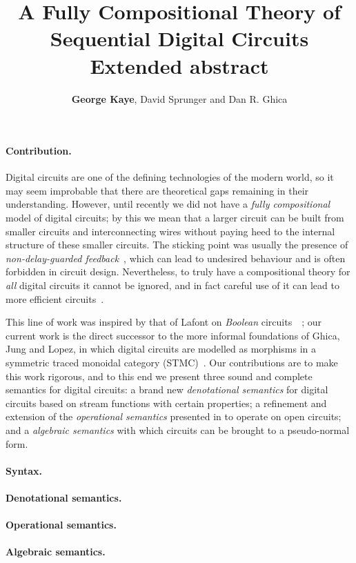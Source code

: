 \documentclass[10pt]{article}
\title{
    \vspace{-3em}
    A Fully Compositional Theory of Sequential Digital Circuits
    \\
    \textbf{Extended abstract}
}
\author{\textbf{George Kaye}, David Sprunger and Dan R. Ghica}
\date{}
\begin{document}
\maketitle

\paragraph*{Contribution.}

Digital circuits are one of the defining technologies of the modern world, so it
may seem improbable that there are theoretical gaps remaining in their
understanding.
However, until recently we did not have a \emph{fully compositional} model of
digital circuits; by this we mean that a larger circuit can be built from
smaller circuits and interconnecting wires without paying heed to the internal
structure of these smaller circuits.
The sticking point was usually the presence of
\emph{non-delay-guarded feedback}~\cite{malik1994analysis}, which can lead to
undesired behaviour and is often forbidden in circuit design.
Nevertheless, to truly have a compositional theory for \emph{all} digital
circuits it cannot be ignored, and in fact careful use of it can lead to more
efficient circuits~\cite{riedel2004cyclic,riedel2012cyclic}.

This line of work was inspired by that of Lafont on
\emph{Boolean} circuits~~\cite{lafont2003algebraic}; our current work is the
direct successor to the more informal foundations of Ghica, Jung and Lopez, in
which digital circuits are modelled as morphisms in a symmetric traced
monoidal category (STMC)~\cite{ghica2016categorical,ghica2017diagrammatic}.
Our contributions are to make this work rigorous, and to this end we present
three sound and complete semantics for digital circuits: a brand new
\emph{denotational semantics} for digital circuits based on stream functions
with certain properties; a refinement and extension of the
\emph{operational semantics} presented in \cite{ghica2017diagrammatic} to
operate on open circuits; and a \emph{algebraic semantics} with which circuits
can be brought to a pseudo-normal form.

\paragraph*{Syntax.}

\paragraph*{Denotational semantics.}

\paragraph*{Operational semantics.}

\paragraph*{Algebraic semantics.}

\printbibliography[heading=bibintoc,title={References}]
\end{document}

